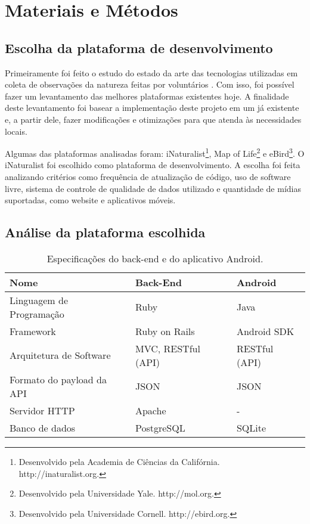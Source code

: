 \section*{Materiais e Métodos}
\subsection*{Escolha da plataforma de desenvolvimento}
Primeiramente foi feito o estudo do estado da arte das tecnologias utilizadas em coleta de observações da natureza feitas por voluntários \cite{azavea2014, azavea2015}. Com isso, foi possível fazer um levantamento das melhores plataformas existentes hoje. A finalidade deste levantamento foi basear a implementação deste projeto em um já existente e, a partir dele, fazer modificações e otimizações para que atenda às necessidades locais. 

Algumas das plataformas analisadas foram: iNaturalist\footnote{Desenvolvido pela Academia de Ciências da Califórnia. http://inaturalist.org.}, Map of Life\footnote{Desenvolvido pela Universidade Yale. http://mol.org.} e eBird\footnote{Desenvolvido pela Universidade Cornell. http://ebird.org.}. O iNaturalist foi escolhido como plataforma de desenvolvimento. A escolha foi feita analizando critérios como frequência de atualização de código, uso de software livre, sistema de controle de qualidade de dados utilizado e quantidade de mídias suportadas, como website e aplicativos móveis.

\subsection*{Análise da plataforma escolhida}

\begin{table}[h!]
  \centering
  \begin{tabular}{lll}
    \toprule
    \textbf{Nome} & \textbf{Back-End} & \textbf{Android} \\
    \midrule
    Linguagem de Programação  & Ruby                & Java \\
    Framework                 & Ruby on Rails       & Android SDK \\
    Arquitetura de Software   & MVC, RESTful (API)  & RESTful (API) \\
    Formato do payload da API & JSON                & JSON \\
    Servidor HTTP             & Apache              & - \\
    Banco de dados            & PostgreSQL          & SQLite \\
    \bottomrule
  \end{tabular}
  
  \caption{Especificações do back-end e do aplicativo Android.}
  \label{tab:back-end-espec}
\end{table}

